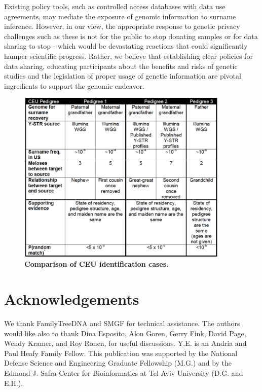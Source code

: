 Existing policy tools, such as controlled access databases with data use agreements, may mediate the exposure of genomic information to surname inference. However, in our view, the appropriate response to genetic privacy challenges such as these is not for the public to stop donating samples or for data sharing to stop - which would be devastating reactions that could significantly hamper scientific progress. Rather, we believe that establishing clear policies for data sharing, educating participants about the benefits and risks of genetic studies \cite{McGuireGibbs2006} and the legislation of proper usage of genetic information are pivotal ingredients to support the genomic endeavor.

\begin{figure}[h!]
\centering
\label{tab:surtab1}
\includegraphics[width=0.9\textwidth]{Figures/App1/Table1.pdf}
\caption{\textbf{Comparison of CEU identification cases.}}
\end{figure}

\section{Acknowledgements}
We thank FamilyTreeDNA and SMGF for technical assistance. The authors would like also to thank Dina Esposito, Alon Goren, Gerry Fink, David Page, Wendy Kramer, and Roy Ronen, for useful discussions. Y.E. is an Andria and Paul Heafy Family Fellow. This publication was supported by the National Defense Science and Engineering Graduate Fellowship (M.G.) and by the Edmond J. Safra Center for Bioinformatics at Tel-Aviv University (D.G. and E.H.). 

